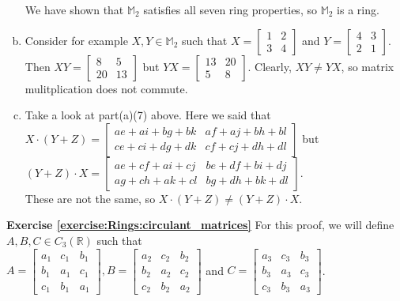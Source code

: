\begin{enumerate}[(a)]
We have shown that ${\mathbb M}_2$ satisfies all seven ring properties, so ${\mathbb M}_2$ is a ring.
\item Consider for example $X,Y\in{\mathbb M}_2$ such that $X=
\begin{bmatrix}
1 & 2\\
3 & 4
\end{bmatrix}$ and $Y=
\begin{bmatrix}
4 & 3\\
2 & 1
\end{bmatrix}$.  Then $XY=
\begin{bmatrix}
8 & 5\\
20 & 13
\end{bmatrix}$
but $YX=
\begin{bmatrix}
13 & 20\\
5 & 8
\end{bmatrix}$.
Clearly, $XY\neq YX$, so matrix mulitplication does not commute.
\item Take a look at part(a)(7) above.  Here we said that\\ 
$X\cdot(Y+Z)=
\begin{bmatrix}
ae+ai+bg+bk & af+aj+bh+bl\\
ce+ci+dg+dk & cf+cj+dh+dl
\end{bmatrix}$ but\\ $(Y+Z)\cdot X=
\begin{bmatrix}
ae+cf+ai+cj & be+df+bi+dj\\
ag+ch+ak+cl & bg+dh+bk+dl
\end{bmatrix}$.\\
These are not the same, so $X\cdot(Y+Z)\neq(Y+Z)\cdot X$.
\end{enumerate}

\noindent\textbf{Exercise \ref{exercise:Rings:circulant_matrices}}
For this proof, we will define $A,B,C\in C_3({\mathbb R})$ such that\\
$A=
\begin{bmatrix}
a_1 & c_1 & b_1\\
b_1 & a_1 & c_1\\
c_1 & b_1 & a_1
\end{bmatrix},
B=
\begin{bmatrix}
a_2 & c_2 & b_2\\
b_2 & a_2 & c_2\\
c_2 & b_2 & a_2
\end{bmatrix}$ 
and $C=
\begin{bmatrix}
a_3 & c_3 & b_3\\
b_3 & a_3 & c_3\\
c_3 & b_3 & a_3
\end{bmatrix}$.

